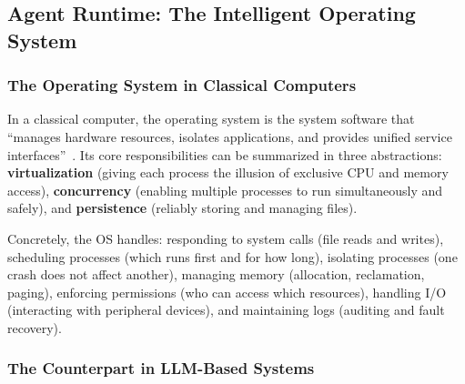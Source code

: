 \documentclass[11pt,a4paper]{article}
\begin{document}
\subsection{Agent Runtime: The Intelligent Operating System}
\label{sec:agent}

\subsubsection{The Operating System in Classical Computers}

In a classical computer, the operating system is the system software that ``manages hardware resources, isolates applications, and provides unified service interfaces''~\cite{ostep_2023}.
Its core responsibilities can be summarized in three abstractions: \textbf{virtualization} (giving each process the illusion of exclusive CPU and memory access), \textbf{concurrency} (enabling multiple processes to run simultaneously and safely), and \textbf{persistence} (reliably storing and managing files).

Concretely, the OS handles: responding to system calls (file reads and writes), scheduling processes (which runs first and for how long), isolating processes (one crash does not affect another), managing memory (allocation, reclamation, paging), enforcing permissions (who can access which resources), handling I/O (interacting with peripheral devices), and maintaining logs (auditing and fault recovery).

\subsubsection{The Counterpart in LLM-Based Systems}
\end{document}
